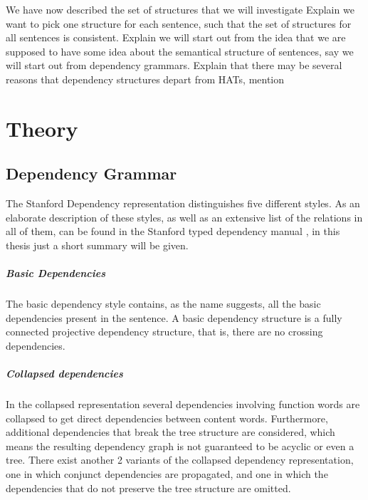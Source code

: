 \documentclass{report}
\theoremstyle{definition}
\theoremstyle{plain}
\begin{document}
We have now described the set of structures that we will investigate
Explain we want to pick one structure for each sentence, such that the set of structures for all sentences is consistent. 
Explain we will start out from the idea that we are supposed to have some idea about the semantical structure of sentences, say we will start out from dependency grammars. 
Explain that there may be several reasons that dependency structures depart from HATs, mention 


\chapter{Theory}

\section{Dependency Grammar}




The Stanford Dependency representation distinguishes five different styles. As an elaborate description of these styles, as well as an extensive list of the relations in all of them, can be found in the Stanford typed dependency manual \citep{de2008stanford}, in this thesis just a short summary will be given.
\paragraph{Basic Dependencies} The basic dependency style contains, as the name suggests, all the basic dependencies present in the sentence. A basic dependency structure is a fully connected projective dependency structure, that is, there are no crossing dependencies.
\paragraph{Collapsed dependencies} In the collapsed representation several dependencies involving function words are collapsed to get direct dependencies between content words. Furthermore, additional dependencies that break the tree structure are considered, which means the resulting dependency graph is not guaranteed to be acyclic or even a tree. There exist another 2 variants of the collapsed dependency representation, one in which conjunct dependencies are propagated, and one in which the dependencies that do not preserve the tree structure are omitted.
\end{document}
